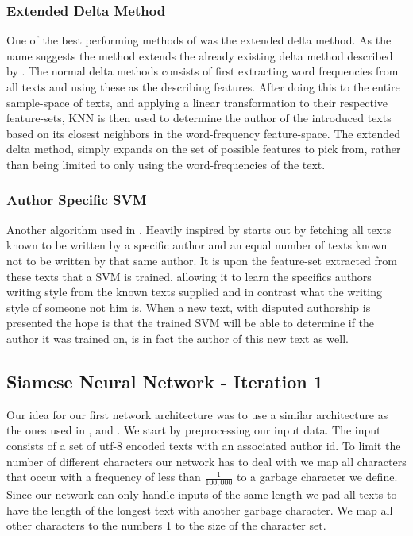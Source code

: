 \subsubsection{Extended Delta Method}

One of the best performing methods of \cite{US} was the extended delta method.
As the name suggests the method extends the already existing delta method
described by \cite{evert2015towards}. The normal delta methods consists of first
extracting word frequencies from all texts and using these as the describing
features. After doing this to the entire sample-space of texts, and applying a
linear transformation to their respective feature-sets, \gls{KNN} is then used
to determine the author of the introduced texts based on its closest neighbors
in the word-frequency feature-space. The extended delta method, simply expands
on the set of possible features to pick from, rather than being limited to only
using the word-frequencies of the text.


\subsubsection{Author Specific SVM}

Another algorithm used in \cite{US}. Heavily inspired by \cite{hansen2014}
starts out by fetching all texts known to be written by a specific author and an
equal number of texts known not to be written by that same author. It is upon
the feature-set extracted from these texts that a \gls{SVM} is trained, allowing
it to learn the specifics authors writing style from the known texts supplied
and in contrast what the writing style of someone not him is. When a new text,
with disputed authorship is presented the hope is that the trained \gls{SVM}
will be able to determine if the author it was trained on, is in fact the author
of this new text as well.


\subsection{Siamese Neural Network - Iteration 1}

Our idea for our first network architecture was to use a similar architecture
as the ones used in \cite{Koch2015SiameseNN}, \cite{NIPS1993_769} and
\cite{qian:2018}. We start by preprocessing our input data. The input consists
of a set of utf-8 encoded texts with an associated author id. To limit the
number of different characters our network has to deal with we map all
characters that occur with a frequency of less than $\frac{1}{100,000}$ to a
garbage character we define. Since our network can only handle inputs of the
same length we pad all texts to have the length of the longest text with another
garbage character. We map all other characters to the numbers 1 to the size of
the character set.


